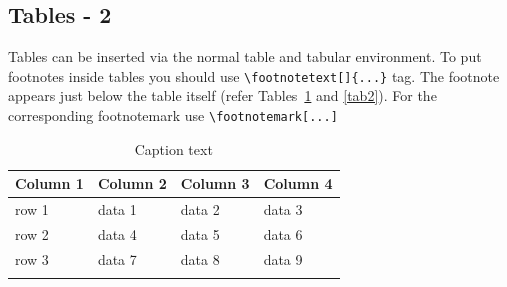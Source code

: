 \documentclass[ml4h-mathphys]{ml4h-jnl}%
\theoremstyle{thmstyleone}%
\theoremstyle{thmstyletwo}%
\theoremstyle{thmstylethree}%
\begin{document}




\subsection{Tables - 2}\label{sec5}

Tables can be inserted via the normal table and tabular environment. To put
footnotes inside tables you should use \verb+\footnotetext[]{...}+ tag.
The footnote appears just below the table itself (refer Tables~\ref{tab1} and \ref{tab2}). 
For the corresponding footnotemark use \verb+\footnotemark[...]+

\begin{table}[h]
\begin{center}
\begin{minipage}{174pt}
\caption{Caption text}\label{tab1}%
\begin{tabular}{@{}llll@{}}
\toprule
Column 1 & Column 2  & Column 3 & Column 4\\
\midrule
row 1    & data 1   & data 2  & data 3  \\
row 2    & data 4   & data 5\footnotemark[1]  & data 6  \\
row 3    & data 7   & data 8  & data 9\footnotemark[2]  \\
\botrule
\end{tabular}
\end{minipage}
\end{center}
\end{table}
\end{document}
